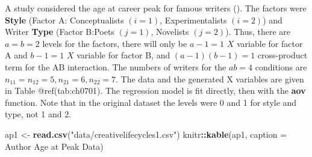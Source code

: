 \documentclass[
]{book}
\newenvironment{Shaded}{\begin{snugshade}}{\end{snugshade}}
\newcommand{\AttributeTok}[1]{\textcolor[rgb]{0.13,0.29,0.53}{#1}}
\newcommand{\FunctionTok}[1]{\textcolor[rgb]{0.13,0.29,0.53}{\textbf{#1}}}
\newcommand{\NormalTok}[1]{#1}
\newcommand{\OtherTok}[1]{\textcolor[rgb]{0.56,0.35,0.01}{#1}}
\newcommand{\SpecialCharTok}[1]{\textcolor[rgb]{0.81,0.36,0.00}{\textbf{#1}}}
\newcommand{\StringTok}[1]{\textcolor[rgb]{0.31,0.60,0.02}{#1}}
\begin{document}
A study considered the age at career peak for famous writers
(). The factors were
\textbf{Style} (Factor A: Conceptualists \((i=1)\), Experimentalists
\((i=2)\)) and Writer \textbf{Type} (Factor B:Poets \((j=1)\), Novelists
\((j=2)\)). Thus, there are \(a=b=2\) levels for the factors, there will
only be \(a-1=1\) \(X\) variable for factor A and \(b-1=1\) \(X\)
variable for factor B, and \((a-1)(b-1)=1\) cross-product term for the
AB interaction. The numbers of writers for the \(ab=4\) conditions are
\(n_{11}=n_{12}=5,n_{21}=6,n_{22}=7\). The data and the generated X
variables are given in Table @ref(tab:ch0701). The regression model is
fit directly, then with the \textbf{aov} function. Note that in the
original dataset the levels were 0 and 1 for style and type, not 1 and
2.

\begin{Shaded}
\begin{Highlighting}[]
\NormalTok{ap1 }\OtherTok{\textless{}{-}} \FunctionTok{read.csv}\NormalTok{(}\StringTok{"data/creativelifecycles1.csv"}\NormalTok{)}
\NormalTok{knitr}\SpecialCharTok{::}\FunctionTok{kable}\NormalTok{(ap1, }\AttributeTok{caption =} \StringTok{\textquotesingle{}Author Age at Peak Data\textquotesingle{}}\NormalTok{)}
\end{Highlighting}
\end{Shaded}
\end{document}
